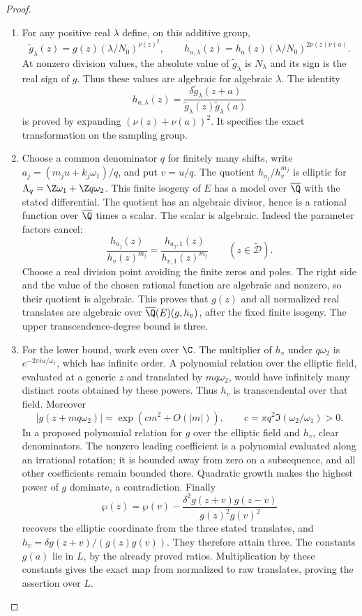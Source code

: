 \begin{proof}
\begin{enumerate}[label=\arabic*.,leftmargin=*]
\item For any positive real $\lambda$ define, on this additive group,
\[
 \widetilde g_\lambda(z)
   =g(z)(\lambda/N_0)^{\nu(z)^2},\qquad
 h_{a,\lambda}(z)
   =h_a(z)(\lambda/N_0)^{2\nu(z)\nu(a)}.
\]
At nonzero division values, the absolute value of
$\widetilde g_\lambda$ is $N_\lambda$ and its sign is the real
sign of $g$. Thus these values are algebraic for algebraic
$\lambda$. The identity
\[
 h_{a,\lambda}(z)=
 \frac{\delta\widetilde g_\lambda(z+a)}
      {\widetilde g_\lambda(z)\widetilde g_\lambda(a)}
\]
is proved by expanding $(\nu(z)+\nu(a))^2$.
It specifies the exact transformation on the sampling group.

\item Choose a common denominator $q$ for finitely many shifts,
write $a_j=(m_ju+k_j\omega_1)/q$, and put $v=u/q$.
The quotient $h_{a_j}/h_v^{m_j}$ is elliptic for
$\Lambda_q=\Z\omega_1+\Z q\omega_2$. This finite isogeny
of $E$ has a model over $\overline\Q$ with the stated
differential. The quotient has an algebraic divisor, hence
is a rational function over $\overline\Q$ times a scalar.
The scalar is algebraic. Indeed the parameter factors cancel:
\[
 \frac{h_{a_j}(z)}{h_v(z)^{m_j}}
  =\frac{h_{a_j,1}(z)}{h_{v,1}(z)^{m_j}}
       \qquad(z\in\widetilde{\mathcal D}).
\]
Choose a real division point avoiding the finite zeros and poles.
The right side and the value of the chosen rational function
are algebraic and nonzero, so their quotient is algebraic.
This proves that $g(z)$ and all normalized real translates are
algebraic over $\overline\Q(E)(g,h_v)$, after the fixed finite
isogeny. The upper transcendence-degree bound is three.

\item For the lower bound, work even over $\C$. The multiplier of
$h_v$ under $q\omega_2$ is $e^{-2\pi iu/\omega_1}$,
which has infinite order. A polynomial relation over the elliptic
field, evaluated at a generic $z$ and translated by $mq\omega_2$,
would have infinitely many distinct roots obtained by these
powers. Thus $h_v$ is transcendental over that field. Moreover
\[
 |g(z+mq\omega_2)|=\exp(c m^2+O(|m|)),
 \qquad c=\pi q^2\Im(\omega_2/\omega_1)>0.
\]
In a proposed polynomial relation for $g$ over the elliptic field
and $h_v$, clear denominators. The nonzero leading coefficient
is a polynomial evaluated along an irrational rotation; it is
bounded away from zero on a subsequence, and all other
coefficients remain bounded there. Quadratic growth makes the
highest power of $g$ dominate, a contradiction. Finally
\[
 \wp(z)=\wp(v)-
 \frac{\delta^2g(z+v)g(z-v)}{g(z)^2g(v)^2}
\]
recovers the elliptic coordinate from the three stated translates,
and $h_v=\delta g(z+v)/(g(z)g(v))$. They therefore attain three.
The constants $g(a)$ lie in $L$, by the already proved ratios.
Multiplication by these constants gives the exact map from
normalized to raw translates, proving the assertion over $L$.


\end{enumerate}
\end{proof}
